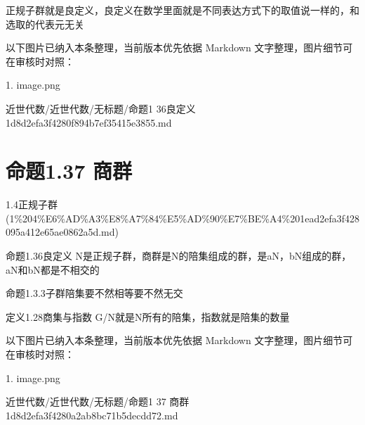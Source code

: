 \begin{proposition}[命题1.36良定义]

正规子群就是良定义，良定义在数学里面就是不同表达方式下的取值说一样的，和选取的代表元无关

\end{proposition}

\begin{note}[关联图片]
以下图片已纳入本条整理，当前版本优先依据 Markdown 文字整理，图片细节可在审核时对照：

1. image.png\\

\end{note}

\begin{note}[来源路径]

近世代数/近世代数/无标题/命题1 36良定义 1d8d2efa3f4280f894b7ef35415e3855.md

\end{note}

\section*{命题1.37 商群}

\begin{note}[来源上级主题]

1.4正规子群 (1\%204\%E6\%AD\%A3\%E8\%A7\%84\%E5\%AD\%90\%E7\%BE\%A4\%201ead2efa3f428095a412e65ae0862a5d.md)

\end{note}

\begin{proposition}[命题1.37 商群]

命题1.36良定义 N是正规子群，商群是N的陪集组成的群，是aN，bN组成的群，aN和bN都是不相交的

命题1.3.3子群陪集要不然相等要不然无交

定义1.28商集与指数 G/N就是N所有的陪集，指数就是陪集的数量

\end{proposition}

\begin{note}[关联图片]
以下图片已纳入本条整理，当前版本优先依据 Markdown 文字整理，图片细节可在审核时对照：

1. image.png\\

\end{note}

\begin{note}[来源路径]

近世代数/近世代数/无标题/命题1 37 商群 1d8d2efa3f4280a2ab8bc71b5decdd72.md

\end{note}

